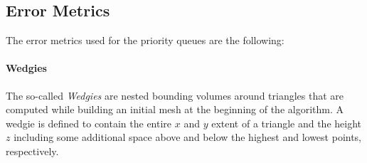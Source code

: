 

\subsection{Error Metrics}
The error metrics used for the priority queues are the following:

\paragraph{Wedgies} The so-called \textit{Wedgies} are nested bounding volumes around triangles that are computed 
while building an initial mesh at the beginning of the algorithm.
A wedgie is defined to contain the entire $x$ and $y$ extent %
of a triangle and the height $z$ including some additional space above and below the highest and lowest points,
respectively.

